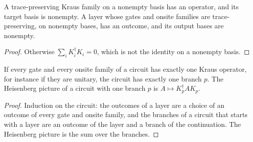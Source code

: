 \begin{lemma}
    \label{lem:circuits_tp_nonempty}
    \leanok
    A trace-preserving Kraus family on a nonempty basis has an operator, and its target
    basis is nonempty. A layer whose gates and onsite families are trace-preserving, on
    nonempty bases, has an outcome, and its output bases are nonempty.
\end{lemma}
\begin{proof}\leanok
    Otherwise $\sum_iK_i^\dagger K_i=0$, which is not the identity on a nonempty basis.
\end{proof}

\begin{lemma}
    \label{lem:circuits_unique_branch}
    \leanok
    If every gate and every onsite family of a circuit has exactly one Kraus operator,
    for instance if they are unitary, the circuit has exactly one branch $p$. The
    Heisenberg picture of a circuit with one branch $p$ is $A\mapsto K_p^\dagger AK_p$.
\end{lemma}
\begin{proof}\leanok
    Induction on the circuit: the outcomes of a layer are a choice of an outcome of every
    gate and onsite family, and the branches of a circuit that starts with a layer are an
    outcome of the layer and a branch of the continuation. The Heisenberg picture is the
    sum over the branches.
\end{proof}

